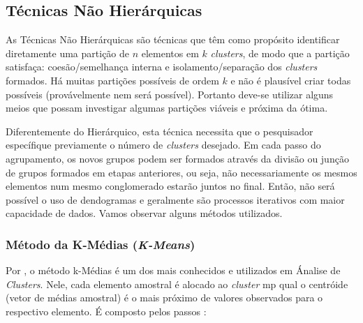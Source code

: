 \documentclass[
]{book}
\begin{document}
\hypertarget{tuxe9cnicas-nuxe3o-hieruxe1rquicas}{%
\subsection{Técnicas Não Hierárquicas}\label{tuxe9cnicas-nuxe3o-hieruxe1rquicas}}

As Técnicas Não Hierárquicas são técnicas que têm como propósito identificar diretamente uma partição de \(n\) elementos em \(k\) \emph{clusters}, de modo que a partição satisfaça: coesão/semelhança interna e isolamento/separação dos \emph{clusters} formados. Há muitas partições possíveis de ordem \(k\) e não é plausível criar todas possíveis (provávelmente nem será possível). Portanto deve-se utilizar alguns meios que possam investigar algumas partições viáveis e próxima da ótima.

Diferentemente do Hierárquico, esta técnica necessita que o pesquisador específique previamente o número de \emph{clusters} desejado. Em cada passo do agrupamento, os novos grupos podem ser formados através da divisão ou junção de grupos formados em etapas anteriores, ou seja, não necessariamente os mesmos elementos num mesmo conglomerado estarão juntos no final. Então, não será possível o uso de dendogramas e geralmente são processos iterativos com maior capacidade de dados. Vamos observar alguns métodos utilizados.

\hypertarget{muxe9todo-da-k-muxe9dias-k-means}{%
\subsubsection{\texorpdfstring{Método da K-Médias (\emph{K-Means})}{Método da K-Médias (K-Means)}}\label{muxe9todo-da-k-muxe9dias-k-means}}

Por \citet{hartigan1979algorithm}, o método k-Médias é um dos mais conhecidos e utilizados em Ánalise de \emph{Clusters}. Nele, cada elemento amostral é alocado ao \emph{cluster} mp qual o centróide (vetor de médias amostral) é o mais próximo de valores observados para o respectivo elemento. É composto pelos passos \citep{mingoti2007analise}:
\end{document}
